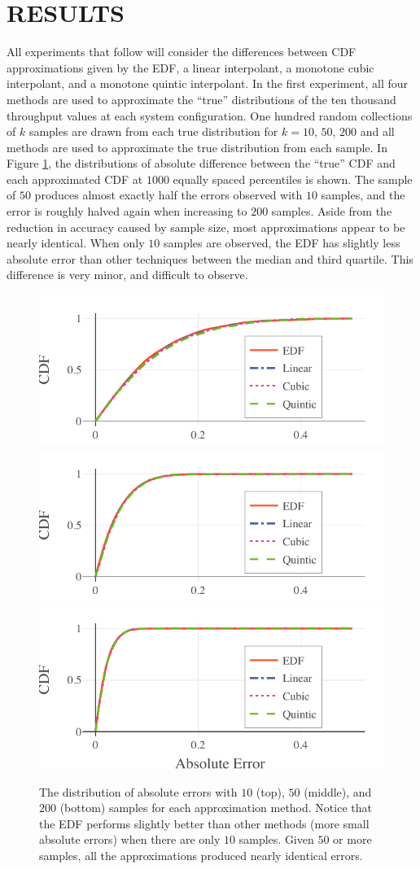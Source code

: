 \documentclass[letterpaper, 10 pt, conference]{ieeeconf}  %
\begin{document}
\section{RESULTS}
\label{sec:results}

All experiments that follow will consider the differences between CDF approximations given by the EDF, a linear interpolant, a monotone cubic interpolant, and a monotone quintic interpolant. In the first experiment, all four methods are used to approximate the ``true'' distributions of the ten thousand throughput values at each system configuration. One hundred random collections of $k$ samples are drawn from each true distribution for $k = 10$, $50$, $200$ and all methods are used to approximate the true distribution from each sample. In Figure \ref{fig:abs-error-dist}, the distributions of absolute difference between the ``true'' CDF and each approximated CDF at $1000$ equally spaced percentiles is shown. The sample of $50$ produces almost exactly half the errors observed with $10$ samples, and the error is roughly halved again when increasing to $200$ samples. Aside from the reduction in accuracy caused by sample size, most approximations appear to be nearly identical. When only $10$ samples are observed, the EDF has slightly less absolute error than other techniques between the median and third quartile. This difference is very minor, and difficult to observe.

\begin{figure}
  \vspace{-.3cm}
  \includegraphics[width=.45\textwidth]{abs-errors-10-samples.pdf}
  \includegraphics[width=.45\textwidth]{abs-errors-50-samples.pdf}
  \includegraphics[width=.45\textwidth]{abs-errors-200-samples.pdf}
  \caption{The distribution of absolute errors with $10$ (top), $50$ (middle), and $200$ (bottom) samples for each approximation method. Notice that the EDF performs slightly better than other methods (more small absolute errors) when there are only $10$ samples. Given $50$ or more samples, all the approximations produced nearly identical errors.
  \vspace{-.5cm}}
  \label{fig:abs-error-dist}
\end{figure}
\end{document}
